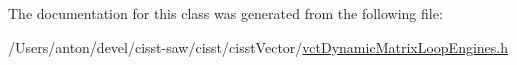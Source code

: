 The documentation for this class was generated from the following file\+:\begin{DoxyCompactItemize}
\item 
/\+Users/anton/devel/cisst-\/saw/cisst/cisst\+Vector/\hyperlink{vct_dynamic_matrix_loop_engines_8h}{vct\+Dynamic\+Matrix\+Loop\+Engines.\+h}\end{DoxyCompactItemize}
